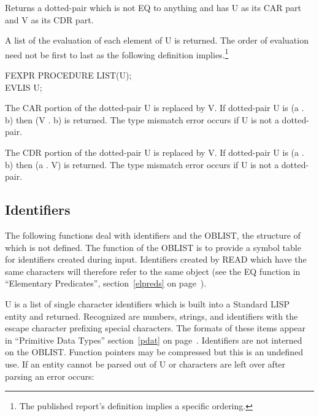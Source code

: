 {Returns a dotted-pair which is not EQ to anything and has U as its
 
CAR part and V as its CDR part.}


{A list of the evaluation of each element of U is returned. The order
of evaluation need not be first to last as the following definition
implies.\footnote{The published report's definition implies a specific
ordering.}

{\tt \begin{tabbing} FEXPR PROCEDURE LIST(U); \\
\hspace*{1em} EVLIS U;
\end{tabbing}}}


{The CAR portion of the dotted-pair U is replaced by V. If dotted-pair
U is (a . b) then (V . b) is returned. The type mismatch error occurs
if U is not a dotted-pair. }


{The CDR portion of the dotted-pair U is replaced by V. If dotted-pair
U is (a . b) then (a . V) is returned. The type mismatch error occurs
if U is not a dotted-pair.}


\subsection{Identifiers}
\label{identifiers}
The following functions deal with identifiers and the OBLIST,
the structure of which is not defined. The function of the OBLIST is
to provide a symbol table for identifiers created during input.
Identifiers created by READ which have the same characters will
 
therefore refer to the same object (see the EQ function in
``Elementary Predicates'', section~\ref{elpreds} on
page~\pageref{elpreds}).



{U is a list of single character identifiers which is built into a
Standard LISP entity and returned. Recognized are numbers, strings,
and identifiers with the escape character prefixing special
characters. The formats of these items appear in ``Primitive Data
Types'' section~\ref{pdat} on page~\pageref{pdat}. Identifiers are not
interned on the OBLIST. Function pointers may be compressed but this
is an undefined use. If an entity cannot be parsed out of U or
characters are left over after parsing an error occurs:

}


